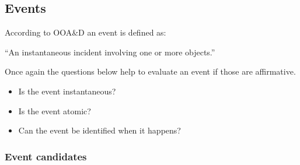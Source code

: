 \subsection{Events}

According to OOA\&D an event is defined as\citep[p.~53]{Rod-Aalborg}:

``An instantaneous incident involving one or more objects.''

Once again the questions below help to evaluate an event if those are affirmative\citep[p.~65]{Rod-Aalborg}.
\begin{itemize}
	\item Is the event instantaneous?
	\item Is the event atomic?
	\item Can the event be identified when it happens?
\end{itemize}

\subsubsection{Event candidates}

